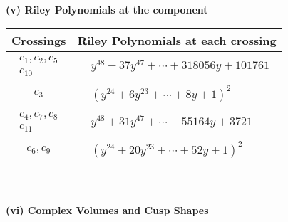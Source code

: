 \documentclass[1p]{elsarticle_modified}
\theoremstyle{definition}
\begin{document}
\newpage\renewcommand{\arraystretch}{1}
\flushleft \textbf{(v) Riley Polynomials at the component}\newline \\
\begin{tabular}{m{50pt}|m{274pt}}
Crossings & \hspace{64pt}Riley Polynomials at each crossing \\
\hline $$\begin{aligned}c_{1},c_{2},c_{5}\\c_{10}\end{aligned}$$&$\begin{aligned}
&y^{48}-37 y^{47}+\cdots+318056 y+101761
\end{aligned}$\\
\hline $$\begin{aligned}c_{3}\end{aligned}$$&$\begin{aligned}
&(y^{24}+6 y^{23}+\cdots+8 y+1)^{2}
\end{aligned}$\\
\hline $$\begin{aligned}c_{4},c_{7},c_{8}\\c_{11}\end{aligned}$$&$\begin{aligned}
&y^{48}+31 y^{47}+\cdots-55164 y+3721
\end{aligned}$\\
\hline $$\begin{aligned}c_{6},c_{9}\end{aligned}$$&$\begin{aligned}
&(y^{24}+20 y^{23}+\cdots+52 y+1)^{2}
\end{aligned}$\\
\hline
\end{tabular}\\~\\
\newpage\flushleft \textbf{(vi) Complex Volumes and Cusp Shapes}
\end{document}
